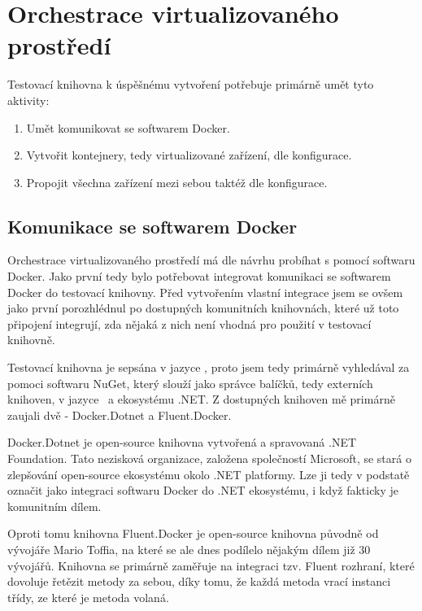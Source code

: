 \section{Orchestrace virtualizovaného prostředí}
Testovací knihovna k úspěšnému vytvoření potřebuje primárně umět tyto aktivity:

\begin{enumerate}
    \item Umět komunikovat se softwarem Docker.
    \item Vytvořit kontejnery, tedy virtualizované zařízení, dle konfigurace.
    \item Propojit všechna zařízení mezi sebou taktéž dle konfigurace.
\end{enumerate}

\subsection{Komunikace se softwarem Docker}
Orchestrace virtualizovaného prostředí má dle návrhu probíhat s pomocí softwaru Docker. 
Jako první tedy bylo potřebovat integrovat komunikaci se softwarem Docker do testovací knihovny. Před vytvořením vlastní integrace jsem se ovšem jako první porozhlédnul po dostupných komunitních knihovnách, které už toto připojení integrují, zda nějaká z nich není vhodná pro použití v testovací knihovně. 

Testovací knihovna je sepsána v jazyce \csharp, proto jsem tedy primárně vyhledával za pomoci softwaru NuGet\cite{nuget}, který slouží jako správce balíčků, tedy externích knihoven, v jazyce \csharp\, a ekosystému .NET. Z dostupných knihoven mě primárně zaujali dvě - Docker.Dotnet\cite{dockerdotnet} a Fluent.Docker\cite{fluentdocker}. 

Docker.Dotnet je open-source knihovna vytvořená a spravovaná .NET Foundation. Tato nezisková organizace, založena společností Microsoft, se stará o zlepšování open-source ekosystému okolo .NET platformy\cite{dotnetfoundation}. Lze ji tedy v podstatě označit jako  integraci softwaru Docker do .NET ekosystému, i když fakticky je komunitním dílem. 

Oproti tomu knihovna Fluent.Docker je open-source knihovna původně od vývojáře Mario Toffia, na které se ale dnes podílelo nějakým dílem již 30 vývojářů. Knihovna se primárně zaměřuje na integraci tzv. Fluent rozhraní, které dovoluje řetězit metody za sebou, díky tomu, že každá metoda vrací instanci třídy, ze které je metoda volaná. \cite{fluentinterface}

